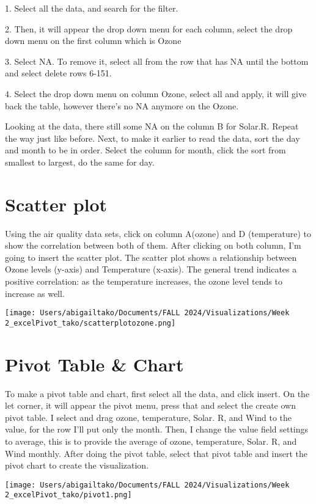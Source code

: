 \documentclass[
  letterpaper,
  DIV=11,
  numbers=noendperiod]{scrreprt}
\begin{document}
1. Select all the data, and search for the filter.

2. Then, it will appear the drop down menu for each column, select the
drop down menu on the first column which is Ozone

3. Select NA. To remove it, select all from the row that has NA until
the bottom and select delete rows 6-151.

4. Select the drop down menu on column Ozone, select all and apply, it
will give back the table, however there's no NA anymore on the Ozone.

Looking at the data, there still some NA on the column B for Solar.R.
Repeat the way just like before. Next, to make it earlier to read the
data, sort the day and month to be in order. Select the column for
month, click the sort from smallest to largest, do the same for day.

\section{Scatter plot}\label{scatter-plot}

Using the air quality data sets, click on column A(ozone) and D
(temperature) to show the correlation between both of them. After
clicking on both column, I'm going to insert the scatter plot. The
scatter plot shows a relationship between Ozone levels (y-axis) and
Temperature (x-axis). The general trend indicates a positive
correlation: as the temperature increases, the ozone level tends to
increase as well.

\texttt{[image: Users/abigailtako/Documents/FALL 2024/Visualizations/Week 2\_excelPivot\_tako/scatterplotozone.png]}

\section{Pivot Table \& Chart}\label{pivot-table-chart}

To make a pivot table and chart, first select all the data, and click
insert. On the let corner, it will appear the pivot menu, press that and
select the create own pivot table. I select and drag ozone, temperature,
Solar. R, and Wind to the value, for the row I'll put only the month.
Then, I change the value field settings to average, this is to provide
the average of ozone, temperature, Solar. R, and Wind monthly. After
doing the pivot table, select that pivot table and insert the pivot
chart to create the visualization.

\texttt{[image: Users/abigailtako/Documents/FALL 2024/Visualizations/Week 2\_excelPivot\_tako/pivot1.png]}
\end{document}

